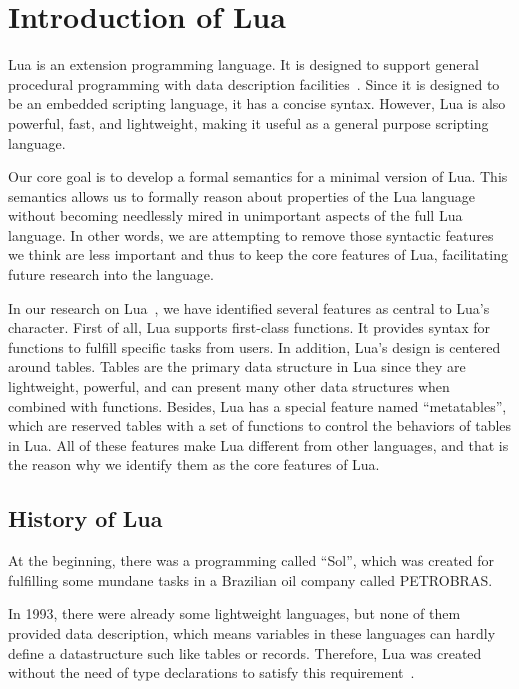 \chapter{Introduction of Lua}
Lua is an extension programming language. It is designed to support general procedural programming with data description facilities~\cite{EEL}. Since it is designed to be an embedded scripting language, it has a concise syntax. However, Lua is also powerful, fast, and lightweight, making it useful as a general purpose scripting language.

Our core goal is to develop a formal semantics for a minimal version of Lua. This semantics allows us to formally reason about properties of the Lua language without becoming needlessly mired in unimportant aspects of the full Lua language. In other words, we are attempting to remove those syntactic features we think are less important and thus to keep the core features of Lua, facilitating future research into the language.


In our research on Lua~\cite{LRM}, we have identified several features as central to Lua's character. First of all, Lua supports first-class functions. It provides syntax for functions to fulfill specific tasks from users. In addition, Lua's design is centered around tables. Tables are the primary data structure in Lua since they are lightweight, powerful, and can present many other data structures when combined with functions. Besides, Lua has a special feature named ``metatables'', which are reserved tables with a set of functions to control the behaviors of tables in Lua. All of these features make Lua different from other languages, and that is the reason why we identify them as the core features of Lua.

\section{History of Lua}
At the beginning, there was a programming called ``Sol'', which was created for fulfilling some mundane tasks in a Brazilian oil company called PETROBRAS. 

In 1993, there were already some lightweight languages, but none of them provided data description, which means variables in these languages can hardly define a datastructure such like tables or records. Therefore, Lua was created without the need of type declarations to satisfy this requirement~\cite{EOL}.

